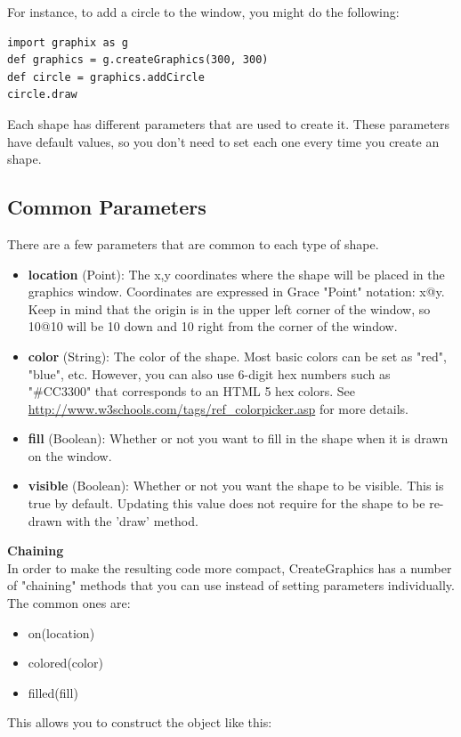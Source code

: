 \documentclass{article}
\begin{document}
For instance, to add a circle to the window, you might do the following:
\begin{lstlisting}
import graphix as g
def graphics = g.createGraphics(300, 300)
def circle = graphics.addCircle
circle.draw
\end{lstlisting}
Each shape has different parameters that are used to create it. These parameters have default values, so you don't need to set each
one every time you create an shape.

\subsection{Common Parameters}
There are a few parameters that are common to each type of shape.

\begin{itemize}
\item \textbf{location} (Point): The x,y coordinates where the shape will be placed in the graphics window. Coordinates are expressed in Grace "Point" notation: x@y. Keep in mind that the origin is in the upper left corner of the window, so 10@10 will be 10 down and 10 right from the corner of the window.
\item \textbf{color} (String): The color of the shape. Most basic colors can be set as "red", "blue", etc. However, you can also use 6-digit hex numbers 
such as "\#CC3300" that corresponds to an HTML 5 hex colors. See \url{http://www.w3schools.com/tags/ref_colorpicker.asp} for more details.
\item \textbf{fill} (Boolean): Whether or not you want to fill in the shape when it is drawn on the window.
\item \textbf{visible} (Boolean): Whether or not you want the shape to be visible. This is true by 
default. Updating this value does not require for the shape to be re-drawn with the 'draw' method.
\end{itemize}

\textbf{Chaining} \\
In order to make the resulting code more compact, CreateGraphics has a number of "chaining"
methods that you can use instead of setting parameters individually. The common ones are:
\begin{itemize}
\item on(location)
\item colored(color)
\item filled(fill)
\end{itemize}

This allows you to construct the object like this:
\end{document}
